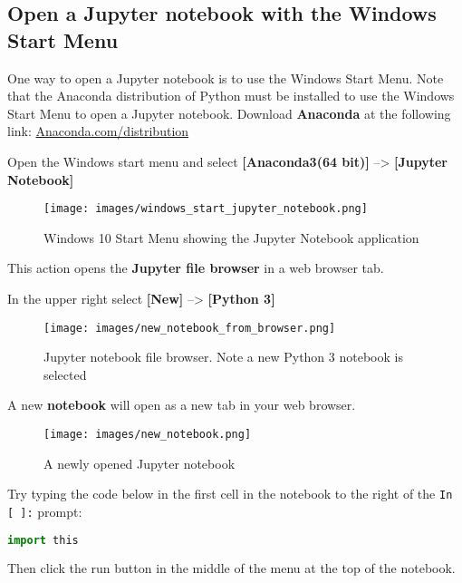 \documentclass{book}
\makeatletter
\def\maxwidth{\ifdim\Gin@nat@width>\linewidth\linewidth
\else\Gin@nat@width\fi}
\let\Oldincludegraphics\includegraphics
\renewcommand{\includegraphics}[1]{\Oldincludegraphics[width=.8\maxwidth]{#1}}
\newcommand{\passthrough}[1]{#1}
\makeatother
\begin{document}
    
        \hypertarget{open-a-jupyter-notebook-with-the-windows-start-menu}{%
\subsection{Open a Jupyter notebook with the Windows Start
Menu}\label{open-a-jupyter-notebook-with-the-windows-start-menu}}
    




    
        One way to open a Jupyter notebook is to use the Windows Start Menu.
Note that the Anaconda distribution of Python must be installed to use
the Windows Start Menu to open a Jupyter notebook. Download
\textbf{Anaconda} at the following link:
\href{https://www.anaconda.com/distribution/}{Anaconda.com/distribution}

Open the Windows start menu and select \textbf{{[}Anaconda3(64 bit){]}}
--\textgreater{} \textbf{{[}Jupyter Notebook{]}}

\begin{figure}
\centering
\texttt{[image: images/windows\_start\_jupyter\_notebook.png]}
\caption{Windows 10 Start Menu showing the Jupyter Notebook application}
\end{figure}

This action opens the \textbf{Jupyter file browser} in a web browser
tab.

In the upper right select \textbf{{[}New{]}} --\textgreater{}
\textbf{{[}Python 3{]}}

\begin{figure}
\centering
\texttt{[image: images/new\_notebook\_from\_browser.png]}
\caption{Jupyter notebook file browser. Note a new Python 3 notebook is
selected}
\end{figure}

A new \textbf{notebook} will open as a new tab in your web browser.

\begin{figure}
\centering
\texttt{[image: images/new\_notebook.png]}
\caption{A newly opened Jupyter notebook}
\end{figure}

Try typing the code below in the first cell in the notebook to the right
of the \passthrough{\lstinline!In [ ]:!} prompt:

\begin{lstlisting}[language=Python]
import this
\end{lstlisting}

Then click the run button in the middle of the menu at the top of the
notebook.
\end{document}
